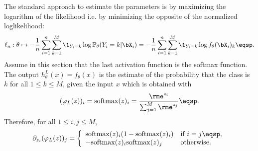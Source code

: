 The standard approach to estimate the parameters is by maximizing the logarithm of the likelihood i.e. by minimizing the opposite of the normalized loglikelihood:
$$
\ell_n:\theta \mapsto -\frac{1}{n} \sum_{i=1}^n\sum_{k=1}^{M} \1_{Y_i=k}\log \mathbb{P}_{\theta}(Y_i = k | \bX_i) = -\frac{1}{n} \sum_{i=1}^n\sum_{k=1}^{M} \1_{Y_i=k}\log f_{\theta}(\bX_i)_k\eqsp.
$$
Assume in this section that the last activation function is the softmax function. The output $h_{\theta}^L(x)= f_{\theta}(x) $ is the estimate of the probability that the class is  $k$ for all $1\leqslant k\leqslant M$, given the input $x$ which is obtained with
\[
(\varphi_L(z))_i = \mathrm{softmax}(z)_i = \frac{\rme^{z_i}}{\sum_{j=1}^M\rme^{z_j}}\eqsp.
\]
Therefore, for all $1\leqslant i,j\leqslant M$,
$$
\partial_{z_i}(\varphi_L(z))_j =  \left\{
    \begin{array}{ll}
        \mathrm{softmax}(z)_i (1-\mathrm{softmax}(z)_i ) & \mbox{if } i=j\eqsp,\\
        - \mathrm{softmax}(z)_i \mathrm{softmax}(z)_j & \mbox{otherwise.}
    \end{array}
\right.
$$

